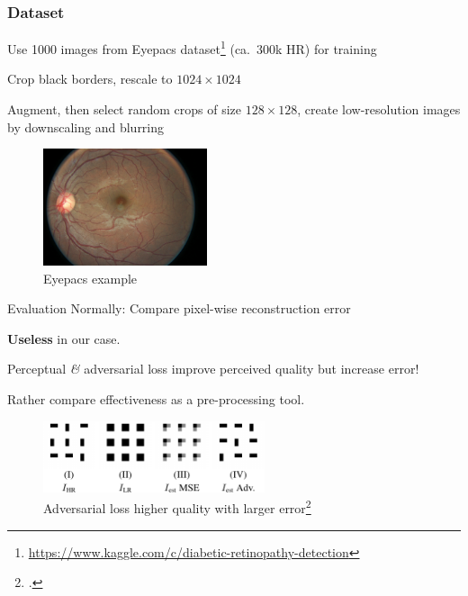 \documentclass{beamer}
\begin{document}
\begin{frame}
   \frametitle{Dataset}
   Use 1000 images from Eyepacs dataset\footnote{\url{https://www.kaggle.com/c/diabetic-retinopathy-detection}} (ca.\ 300k HR) for training

   Crop black borders, rescale to $1024 \times 1024$

   Augment, then select random crops of size $128 \times 128$, create low-resolution images by downscaling and blurring

   \begin{figure}[h]
     \centering
     \includegraphics[width=0.43\textwidth]{eyepacs_example}
     \caption*{Eyepacs example}
   \end{figure}
\end{frame}

\begin{frame}{Evaluation}
  Normally: Compare pixel-wise reconstruction error

  \textbf{Useless} in our case.

  Perceptual \textit{\&} adversarial loss improve perceived quality but increase error!

  Rather compare effectiveness as a pre-processing tool.

  \begin{figure}[h]
    \centering
    \includegraphics[width=0.58\textwidth]{adversarial_loss}
    \caption*{Adversarial loss higher quality with larger error\footcite{EnhanceNet}}
  \end{figure}
\end{frame}
\end{document}
